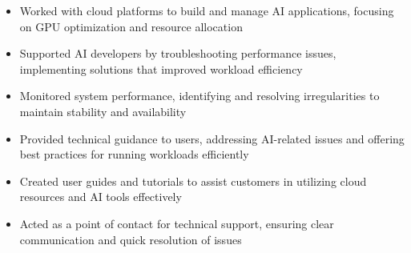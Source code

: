 \par\smallskip
\noindent
\begin{minipage}{20cm}
  \begin{minipage}{9.75cm}
    \begin{itemize}
      \item Worked with cloud platforms to build and manage AI applications, focusing on GPU optimization and resource allocation
      \item Supported AI developers by troubleshooting performance issues, implementing solutions that improved workload efficiency
      \item Monitored system performance, identifying and resolving irregularities to maintain stability and availability
    \end{itemize}
  \end{minipage}
  \hfill
  \begin{minipage}{9.75cm}
    \begin{itemize}
      \item Provided technical guidance to users, addressing AI-related issues and offering best practices for running workloads efficiently
      \item Created user guides and tutorials to assist customers in utilizing cloud resources and AI tools effectively
      \item Acted as a point of contact for technical support, ensuring clear communication and quick resolution of issues
    \end{itemize}
  \end{minipage}
\end{minipage}
\par\smallskip
\divider

